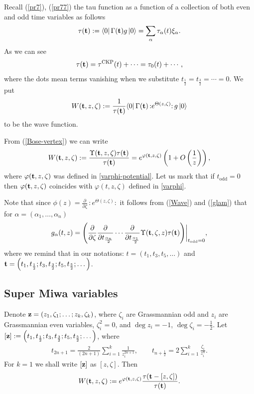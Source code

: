 \documentclass[pdftex]{sigma}
\numberwithin{equation}{section}
\begin{document}
Recall (\ref{pr7}), (\ref{pr77}) the tau function as a function of a collection of
both even and odd time variables as follows
  \begin{gather}\label{superTau}
\tau({\bf t}):=\langle 0|\,\Gamma({\bf t})  g \,|0\rangle =
\sum_\alpha  \tau_\alpha(t) \xi_\alpha .
  \end{gather}
As we can see
  \[
\tau({\bf t})=\tau^{{\rm CKP}}( t)+\cdots=\tau_0( t)+\cdots ,
  \]
  where the dots mean terms vanishing when we substitute $t_{\frac12}= t_{\frac32}=\cdots =0$.
  We put
 \begin{gather}\label{super-wave}
 W({\bf t},z,\zeta):=\frac{1}{\tau({\bf t})}\langle 0|\,\Gamma({\bf t})\,
 {:}e^{\Theta(z,\zeta)}{:} \, g
 \,|0\rangle
\end{gather}
  to be the wave function.

From (\ref{Bose-vertex}) we can write
 \begin{gather}\label{Wtau}
 W({\bf t},z,\zeta):=\frac{\Upsilon({\bf t},z,\zeta)\tau({\bf t})}{\tau({\bf
 t})} = e^{\varphi({\bf t},z,\zeta)}\left( 1+O\left(\frac 1z \right)\right) ,
  \end{gather}
where $\varphi({\bf t},z,\zeta)$ was def\/ined in \eqref{varphi-potential}. Let us mark that if $t_\mathrm{odd}=0$ then
$\varphi({\bf t},z,\zeta)$ coincides with $\varphi({ t},z,\zeta)$ def\/ined in \eqref{varphi}.


Note that since $\phi(z)=\frac{\partial}{\partial
\zeta}\,{:}e^{\Theta(z,\zeta)}{:}$ it follows from (\ref{Wave}) and  (\ref{glam}) that for
$\alpha=(\alpha_1,\dots,\alpha_n)$
\[
g_\alpha({t},z) = \left(\frac{\partial}{\partial
\zeta}\frac{\partial}{\partial t_{\frac{\alpha_{n}}{2}}}\cdots
\frac{\partial}{\partial t_{\frac{\alpha_{1}}{2}}} \Upsilon({\bf
t},\zeta,z)\tau({\bf t}) \right)\biggr|_{t_\mathrm{odd} =0},
\]
 where we remind that in our notations: $ t=\left(t_1,t_3,t_5,\dots \right)$ and
 ${\bf t}=
 \left(t_1,t_{\frac 12};t_3,t_{\frac 32};t_5,t_{\frac 52};\dots \right)$.


\subsection{Super Miwa variables}

Denote ${\bf z}=(z_1,\zeta_1;\ldots;z_k,\zeta_k)$, where
$\zeta_i$ are Grassmannian odd and $z_i$ are Grassmannian even
variables, $\zeta_i^2=0$,  and $\deg z_i = -1$, $\deg \zeta_i = -\frac
12$. Let $ [{\bf z}]:=\left(t_1,t_{\frac 12};t_3,t_{\frac 32};t_5,t_{\frac 52};\dots
 \right)$, where
 \begin{gather}\label{s-Miwa}
t_{2n+1}=\frac{2}{(2n+1)}\sum_{i=1}^k\frac 1{z_i^{2n+1}} ,\qquad
t_{n+\frac12} = 2\sum_{i=1}^k\frac{\zeta_i}{z_i^{n}} .
  \end{gather}
  For $k=1$ we shall write $[{\bf z}]$ as $[z,\zeta ]$.
Then
\[
W({\bf t},z,\zeta):=e^{\varphi({\bf t},z,\zeta)}\frac{\tau({\bf
t}-[{z},\zeta])}{\tau({\bf t})}.
\]
\end{document}

